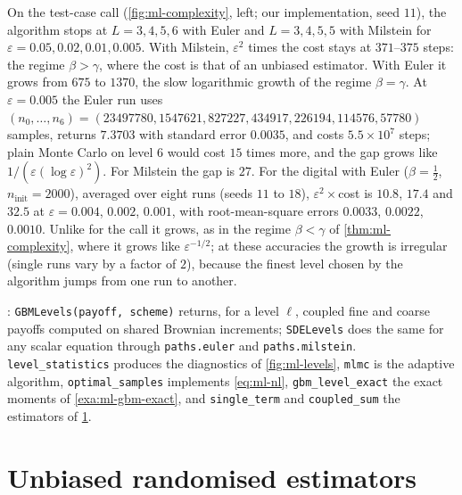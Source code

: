 On the test-case call (\cref{fig:ml-complexity}, left; our implementation, seed $11$), the
algorithm stops at $L=3,4,5,6$ with Euler and $L=3,4,5,5$ with Milstein for
$\varepsilon=0.05,0.02,0.01,0.005$. With Milstein, $\varepsilon^2$ times the cost stays at
$371$--$375$ steps: the regime $\beta>\gamma$, where the cost is that of an unbiased estimator. With
Euler it grows from $675$ to $1370$, the slow logarithmic growth of the regime $\beta=\gamma$. At
$\varepsilon=0.005$ the Euler run uses $(n_0,\dots,n_6)=(23497780, 1547621, 827227, 434917, 226194,
114576, 57780)$ samples, returns $7.3703$ with standard error $0.0035$, and costs
$5.5\times10^7$ steps; plain Monte Carlo on level $6$ would cost $15$ times more, and the gap
grows like $1/(\varepsilon(\log\varepsilon)^2)$. For Milstein the gap is $27$. For the digital with
Euler ($\beta=\frac12$, $n_{\mathrm{init}}=2000$), averaged over eight runs (seeds $11$ to $18$),
$\varepsilon^2\times$cost is $10.8$, $17.4$ and $32.5$ at $\varepsilon=0.004$, $0.002$, $0.001$,
with root-mean-square errors $0.0033$, $0.0022$, $0.0010$. Unlike for the call it grows, as in the
regime $\beta<\gamma$ of \cref{thm:ml-complexity}, where it grows like $\varepsilon^{-1/2}$; at these
accuracies the growth is irregular (single runs vary by a factor of $2$), because the finest level
chosen by the algorithm jumps from one run to another.


\begin{incode}
: \texttt{GBMLevels(payoff, scheme)} returns, for a level
$\ell$, coupled fine and coarse payoffs computed on shared Brownian increments; \texttt{SDELevels}
does the same for any scalar equation through \texttt{paths.euler} and \texttt{paths.milstein}.
\texttt{level\_statistics} produces the diagnostics of \cref{fig:ml-levels}, \texttt{mlmc} is the
adaptive algorithm, \texttt{optimal\_samples} implements \eqref{eq:ml-nl}, \texttt{gbm\_level\_exact}
the exact moments of \cref{exa:ml-gbm-exact}, and \texttt{single\_term} and \texttt{coupled\_sum} the
estimators of \cref{sec:ml-unbiased}.
\end{incode}

\section{Unbiased randomised estimators}\label{sec:ml-unbiased}

